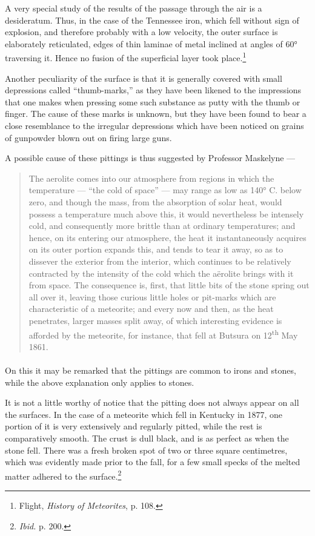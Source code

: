 \documentclass[a4paper, 12pt, oneside, polutonikogreek, english]{article}
\begin{document}
A very special study of the results of the passage through the air is a desideratum. Thus, in the case of the Tennessee iron, which fell without sign of explosion, and therefore probably with a low velocity, the outer surface is elaborately reticulated, edges of thin laminae of metal inclined at angles of 60° traversing it. Hence no fusion of the superficial layer took place.\footnote{Flight, \emph{History of Meteorites}, p. 108.}

Another peculiarity of the surface is that it is generally covered with small depressions called ``thumb-marks,'' as they have been likened to the impressions that one makes when pressing some such substance as putty with the thumb or finger. The cause of these marks is unknown, but they have been found to bear a close resemblance to the irregular depressions which have been noticed on grains of gunpowder blown out on firing large guns.

A possible cause of these pittings is thus suggested by Professor Maskelyne ---
\begin{quotation}
The aerolite comes into our atmosphere from regions in which the temperature --- ``the cold of space'' --- may range as low as 140° C. below zero, and though the mass, from the absorption of solar heat, would possess a temperature much above this, it would nevertheless be intensely cold, and consequently more brittle than at ordinary temperatures; and hence, on its entering our atmosphere, the heat it instantaneously acquires on its outer portion expands this, and tends to tear it away, so as to dissever the exterior from the interior, which continues to be relatively contracted by the intensity of the cold which the aërolite brings with it from space. The consequence is, first, that little bits of the stone spring out all over it, leaving those curious little holes or pit-marks which are characteristic of a meteorite; and every now and then, as the heat penetrates, larger masses split away, of which interesting evidence is afforded by the meteorite, for instance, that fell at Butsura on 12\textsuperscript{th} May 1861.
\end{quotation}
\paragraph{}
On this it may be remarked that the pittings are common to irons and stones, while the above explanation only applies to stones.

It is not a little worthy of notice that the pitting does not always appear on all the surfaces. In the case of a meteorite which fell in Kentucky in 1877, one portion of it is very extensively and regularly pitted, while the rest is comparatively smooth. The crust is dull black, and is as perfect as when the stone fell. There was a fresh broken spot of two or three square centimetres, which was evidently made prior to the fall, for a few small specks of the melted matter adhered to the surface.\footnote{\emph{Ibid.} p. 200.}
\end{document}

